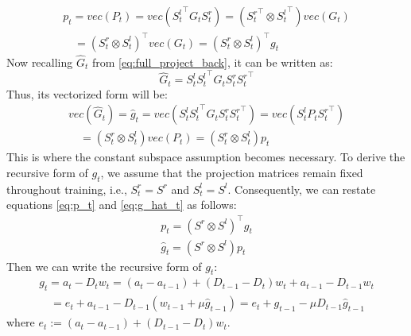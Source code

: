 \begin{equation}
\begin{gathered}
    p_t = vec(P_t) = vec({S_t^l}^\top G_t S_t^r) = ({S_t^r}^\top \otimes {S_t^l}^\top)vec(G_t) \\ \quad
    = {(S_t^r \otimes S_t^l)}^\top vec(G_t) = {(S_t^r \otimes S_t^l)}^\top g_t 
    \label{eq:p_t}
\end{gathered}
\end{equation}
Now recalling \(\widehat{G}_t\) from \eqref{eq:full_project_back}, it can be written as:
\begin{equation*}
    \widehat{G}_{t} = S_{t}^l {S_{t}^l}^\top G_{t} S_{t}^r {S_{t}^r}^\top
\end{equation*}
Thus, its vectorized form will be:
\begin{equation}
\begin{gathered}
    vec(\widehat{G}_t) = \widehat{g}_t = vec(S_{t}^l {S_{t}^l}^\top G_{t} S_{t}^r {S_{t}^r}^\top) = vec(S_{t}^l P_t {S_{t}^r}^\top) \\ \quad
    = (S_{t}^r \otimes S_{t}^l)vec(P_t) = (S_{t}^r \otimes S_{t}^l)p_t
    \label{eq:g_hat_t}
\end{gathered}
\end{equation}
This is where the constant subspace assumption becomes necessary. To derive the recursive form of \(g_t\), we assume that the projection matrices remain fixed throughout training, i.e., \(S_t^r = S^r\) and \(S_t^l = S^l\). Consequently, we can restate equations \eqref{eq:p_t} and \eqref{eq:g_hat_t} as follows:
\begin{eqnarray}
p_t = {(S^r \otimes S^l)}^\top g_t \label{eq:14} \\
\widehat{g}_t = (S^r \otimes S^l) p_t \label{eq:15}
\end{eqnarray}
Then we can write the recursive form of \(g_t\):
\begin{equation}
\begin{gathered}
\label{eq:16}
    g_t = a_t - D_t w_t = (a_t - a_{t-1}) + (D_{t-1} - D_t) w_t + a_{t-1} - D_{t-1}w_t \\ \quad 
    = e_t + a_{t-1} - D_{t-1}(w_{t-1} + \mu \widehat{g}_{t-1}) = e_t + g_{t-1} - \mu D_{t-1} \widehat{g}_{t-1}  
\end{gathered}
\end{equation}
where \(e_t := (a_t - a_{t-1}) + (D_{t-1} - D_t) w_t\). 

